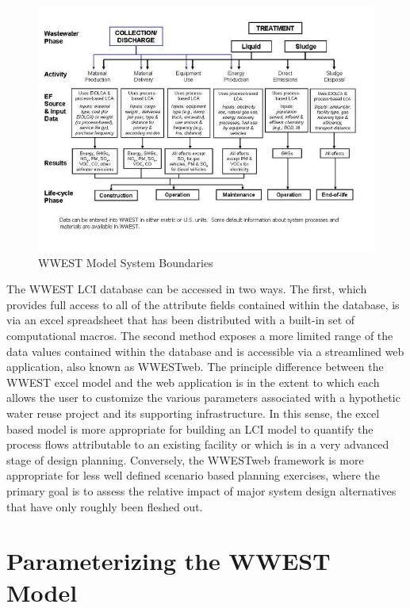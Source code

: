     \begin{figure}[!h]
        \begin{center}
        \includegraphics[width=5.5in]{figures/WWEST_System_Boundaries.jpg}
        \caption{WWEST Model System Boundaries}
        \label{fig:WWESTsystem}
        \end{center}
    \end{figure}
    
The WWEST LCI database can be accessed in two ways. The first, which provides full access to all of the attribute fields contained within the database, is via an excel spreadsheet that has been distributed with a built-in set of computational macros. The second method exposes a more limited range of the data values contained within the database and is accessible via a streamlined web application, also known as WWESTweb. The principle difference between the WWEST excel model and the web application is in the extent to which each allows the user to customize the various parameters associated with a hypothetic water reuse project and its supporting infrastructure. In this sense, the excel based model is more appropriate for building an LCI model to quantify the process flows attributable to an existing facility or which is in a very advanced stage of design planning. Conversely, the WWESTweb framework is more appropriate for less well defined scenario based planning exercises, where the primary goal is to assess the relative impact of major system design alternatives that have only roughly been fleshed out.

\section{Parameterizing the WWEST Model} 

